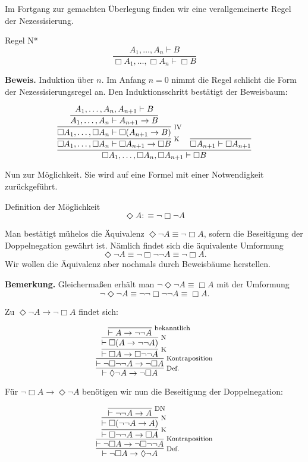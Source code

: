 \documentclass[8pt]{beamer}
\newcommand{\strong}[1]{\textsf{\textbf{#1}}}
\newcommand{\infernote}[1]{\!\text{\footnotesize #1}}
\newcommand{\cond}{\rightarrow}
\newcommand{\lnec}{\Box}
\newcommand{\lpos}{\Diamond}
\begin{document}
\begin{frame}
Im Fortgang zur gemachten Überlegung finden wir eine verallgemeinerte
Regel der Nezessisierung.
\begin{block}{Regel N*}
\[\dfrac{A_1,\ldots,A_n\vdash B}{\lnec A_1,\ldots,\lnec A_n\vdash\lnec B}\]
\end{block}\pause
\strong{Beweis.}
Induktion über $n$. Im Anfang $n=0$ nimmt die Regel schlicht die Form
der Nezessisierungsregel an. Den Induktionsschritt bestätigt der Beweisbaum:

\[
\infer{\lnec A_1,\ldots,\lnec A_n,\lnec A_{n+1}\vdash\lnec B}{
  \infer[\infernote{K}]{\lnec A_1,\ldots,\lnec A_n\vdash\lnec A_{n+1}\cond\lnec B}{
    \infer[\infernote{IV}]{\lnec A_1,\ldots,\lnec A_n\vdash\lnec (A_{n+1}\cond B)}{
      \infer{A_1,\ldots,A_n\vdash A_{n+1}\cond B}{
        A_1,\ldots,A_n,A_{n+1}\vdash B}}}
& \infer{\lnec A_{n+1}\vdash\lnec A_{n+1}}{}}
\]
\end{frame}

\begin{frame}
Nun zur Möglichkeit. Sie wird auf eine Formel mit einer
Notwendigkeit zurückgeführt.
\begin{block}{Definition der Möglichkeit}
\[\lpos A :\equiv \neg\lnec\neg A\]
\end{block}\pause

\vspace{2em}
Man bestätigt mühelos die Äquivalenz $\lpos\neg A\equiv\neg\lnec A$,
sofern die Beseitigung der Doppelnegation gewährt ist.\pause{} Nämlich
findet sich die äquivalente Umformung
\[\lpos\neg A\equiv\neg\lnec\neg\neg A\equiv\neg\lnec A.\]
Wir wollen die Äquivalenz aber nochmals durch Beweisbäume herstellen.\pause

\vspace{2em}
\begin{small}
\strong{Bemerkung.} Gleichermaßen erhält man $\neg\lpos\neg A\equiv\lnec A$
mit der Umformung
\[\neg\lpos\neg A\equiv\neg\neg\lnec\neg\neg A\equiv\lnec A.\]
\end{small}
\end{frame}

\begin{frame}
Zu $\lpos\neg A\cond\neg\lnec A$ findet sich:\pause

\[
\infer[\infernote{Def.}]{\vdash\lpos\neg A\cond\neg\lnec A}{
  \infer[\infernote{Kontraposition}]{\vdash\neg\lnec\neg\neg A\cond\neg\lnec A}{
    \infer[\infernote{K}]{\vdash\lnec A\cond\lnec\neg\neg A}{
      \infer[\infernote{N}]{\vdash\lnec (A\cond\neg\neg A)}{
        \infer[\infernote{bekanntlich}]{\vdash A\cond\neg\neg A}{}
      }
    }
  }}
\]\pause

Für $\neg\lnec A\cond\lpos\neg A$ benötigen wir nun die Beseitigung
der Doppelnegation:\pause

\[
\infer[\infernote{Def.}]{\vdash\neg\lnec A\cond\lpos\neg A}{
  \infer[\infernote{Kontraposition}]{\vdash\neg\lnec A\cond\neg\lnec\neg\neg A}{
    \infer[\infernote{K}]{\vdash\lnec\neg\neg A\cond\lnec A}{
      \infer[\infernote{N}]{\vdash\lnec(\neg\neg A\cond A)}{
        \infer[\infernote{DN}]{\vdash\neg\neg A\cond A}{}}}}}
\]
\end{frame}
\end{document}
